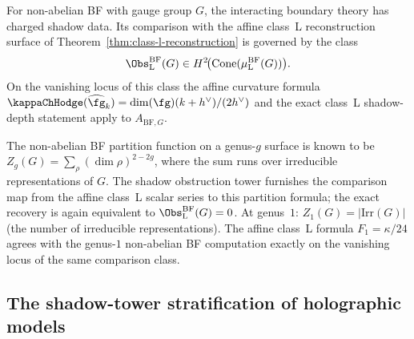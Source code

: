 \begin{remark}
For non-abelian BF with gauge group $G$, the interacting boundary theory has
charged shadow data. Its comparison with the affine class~L reconstruction
surface of Theorem~\ref{thm:class-l-reconstruction} is governed by the class
\[
\Obs^{\mathrm{BF}}_{\mathrm{L}}(G)\in
H^2\!\bigl(\Cone(\mu^{\mathrm{BF}}_{\mathrm{L}}(G))\bigr).
\]
On the vanishing locus of this class the affine curvature formula
$\kappaChHodge(\widehat{\fg}_k)=\dim(\fg)(k+h^\vee)/(2h^\vee)$ and the exact
class~L shadow-depth statement apply to $A_{\mathrm{BF},G}$.

The non-abelian BF partition function on a genus-$g$ surface is known to be
$Z_g(G) = \sum_{\rho} (\dim\rho)^{2-2g}$, where the sum runs over irreducible
representations of $G$. The shadow obstruction tower furnishes the comparison
map from the affine class~L scalar series to this partition formula; the exact
recovery is again equivalent to $\Obs^{\mathrm{BF}}_{\mathrm{L}}(G)=0$.
At genus~$1$: $Z_1(G) = |\mathrm{Irr}(G)|$ (the number of irreducible representations).
The affine class~L formula $F_1=\kappa/24$ agrees with the genus-$1$
non-abelian BF computation exactly on the vanishing locus of the same
comparison class.
\end{remark}

\subsection{The shadow-tower stratification of holographic models}

